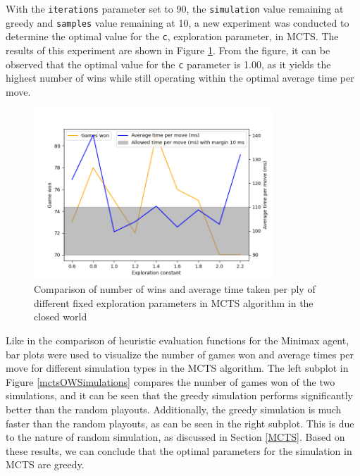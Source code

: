 With the \texttt{iterations} parameter set to 90, the \texttt{simulation} value remaining at greedy and \texttt{samples} value remaining at 10, a new experiment was conducted to determine the optimal value for the \texttt{c}, exploration parameter, in MCTS. The results of this experiment are shown in Figure \ref{mctsCWC}. From the figure, it can be observed that the optimal value for the \texttt{c} parameter is 1.00, as it yields the highest number of wins while still operating within the optimal average time per move.

\begin{figure}[h]
  \centering
  \captionsetup{justification=centering}
  \includegraphics[width=0.8\textwidth]{../img/mcts_c_closedworld.png}
  \caption{Comparison of number of wins and average time taken per ply of different fixed exploration parameters in MCTS algorithm in the closed world}
  \label{mctsCWC}
\end{figure}

Like in the comparison of heuristic evaluation functions for the Minimax agent, bar plots were used to visualize the number of games won and average times per move for different simulation types in the MCTS algorithm. The left subplot in Figure \ref{mctsOWSimulations} compares the number of games won of the two simulations, and it can be seen that the greedy simulation performs significantly better than the random playouts. Additionally, the greedy simulation is much faster than the random playouts, as can be seen in the right subplot. This is due to the nature of random simulation, as discussed in Section \ref{MCTS}. Based on these results, we can conclude that the optimal parameters for the simulation in MCTS are greedy.


